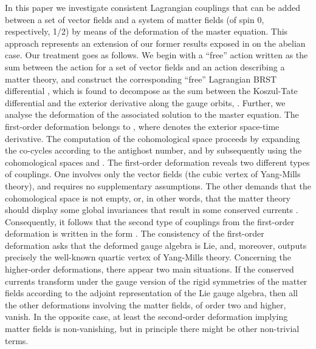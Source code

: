 \documentclass[a4paper,12pt]{article}
\begin{document}
In this paper we investigate consistent
Lagrangian couplings that can be
added between a set of vector fields and a
system of matter fields (of spin
0, respectively, 1/2) by means of the
deformation of the master equation.
This approach represents an extension of
our former results exposed in \cite
{20a} on the abelian case. Our treatment
goes as follows. We begin with a
``free'' action written as the sum between
the action for a set of vector
fields and an action describing a matter theory,
and construct the
corresponding ``free'' Lagrangian BRST
differential \coordHE{}, which is found to
decompose as the sum between the Koszul-Tate
differential and the exterior
derivative along the gauge orbits,
\coordHE{}. Further, we analyse
the deformation of the associated solution
to the master equation. The
first-order deformation belongs to
\coordHE{}, where \coordHE{} denotes
the exterior space-time derivative. The
computation of the cohomological space
\coordHE{} proceeds by
expanding the co-cycles according to
the antighost number, and by
subsequently using the cohomological spaces
\coordHE{} and \coordHE{}. The first-order
deformation reveals two
different types of couplings. One involves
only the vector fields (the cubic
vertex of Yang-Mills theory), and requires
no supplementary assumptions. The
other demands that the cohomological space
\coordHE{}
is not empty, or, in other words, that the
matter theory should display some
global invariances that result in some
conserved currents \coordHE{}%
. Consequently, it follows that the second
type of couplings from the
first-order deformation is written in the
form \coordHE{}%
. The consistency of the first-order
deformation asks that the deformed
gauge algebra is Lie, and, moreover,
outputs precisely the well-known
quartic vertex of Yang-Mills theory.
Concerning the higher-order
deformations, there appear two main situations.
If the conserved currents \coordHE{} transform under the
gauge version of the rigid symmetries
of the matter fields according to the
adjoint representation of the Lie
gauge algebra, then all the other
deformations involving the matter fields,
of order two and higher, vanish. In the
opposite case, at least the
second-order deformation implying matter
fields is non-vanishing, but in
principle there might be other non-trivial terms.
\end{document}
